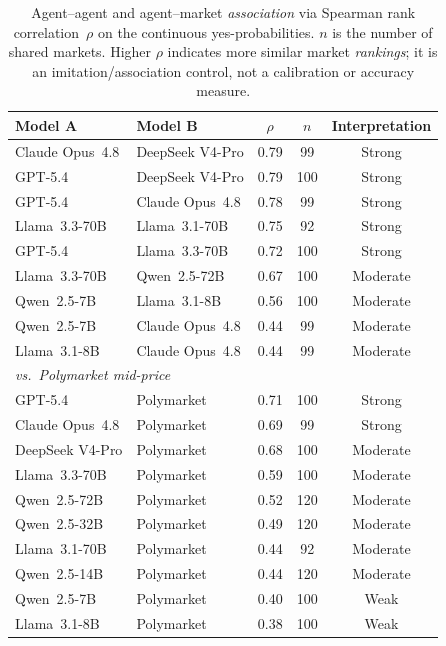\documentclass{article} %
\begin{document}
\begin{table}[h]
\centering
\caption{Agent--agent and agent--market \emph{association} via Spearman rank
correlation~$\rho$ on the continuous yes-probabilities.  $n$ is the number of shared
markets.  Higher $\rho$ indicates more similar market \emph{rankings}; it is an
imitation/association control, not a calibration or accuracy measure.}
\label{tab:rho-pairs}
\small
\begin{tabular}{llccc}
\toprule
\textbf{Model A} & \textbf{Model B} & $\rho$ & $n$ & \textbf{Interpretation} \\
\midrule
Claude Opus~4.8  & DeepSeek V4-Pro & 0.79 &  99 & Strong \\
GPT-5.4          & DeepSeek V4-Pro & 0.79 & 100 & Strong \\
GPT-5.4          & Claude Opus~4.8 & 0.78 &  99 & Strong \\
\midrule
Llama~3.3-70B    & Llama~3.1-70B   & 0.75 &  92 & Strong \\
GPT-5.4          & Llama~3.3-70B   & 0.72 & 100 & Strong \\
Llama~3.3-70B    & Qwen~2.5-72B    & 0.67 & 100 & Moderate \\
Qwen~2.5-7B      & Llama~3.1-8B    & 0.56 & 100 & Moderate \\
Qwen~2.5-7B      & Claude Opus~4.8 & 0.44 &  99 & Moderate \\
Llama~3.1-8B     & Claude Opus~4.8 & 0.44 &  99 & Moderate \\
\midrule
\multicolumn{5}{l}{\textit{vs.\ Polymarket mid-price}} \\
\midrule
GPT-5.4          & Polymarket & 0.71 & 100 & Strong \\
Claude Opus~4.8  & Polymarket & 0.69 &  99 & Strong \\
DeepSeek V4-Pro  & Polymarket & 0.68 & 100 & Moderate \\
Llama~3.3-70B    & Polymarket & 0.59 & 100 & Moderate \\
Qwen~2.5-72B     & Polymarket & 0.52 & 120 & Moderate \\
Qwen~2.5-32B     & Polymarket & 0.49 & 120 & Moderate \\
Llama~3.1-70B    & Polymarket & 0.44 &  92 & Moderate \\
Qwen~2.5-14B     & Polymarket & 0.44 & 120 & Moderate \\
Qwen~2.5-7B      & Polymarket & 0.40 & 100 & Weak \\
Llama~3.1-8B     & Polymarket & 0.38 & 100 & Weak \\
\bottomrule
\end{tabular}
\end{table}
\end{document}
